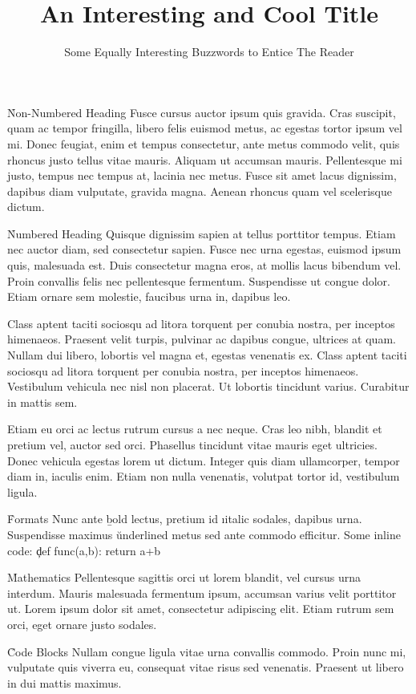 \documentclass{thesis}
\title    {An Interesting and Cool Title}
\subtitle {Some Equally Interesting Buzzwords to Entice The Reader}
\begin{document}

\h*{Non-Numbered Heading}
Fusce cursus auctor ipsum quis gravida. Cras suscipit, quam ac tempor fringilla, libero felis euismod metus, ac egestas tortor ipsum vel mi. Donec feugiat, enim et tempus consectetur, ante metus commodo velit, quis rhoncus justo tellus vitae mauris. Aliquam ut accumsan mauris. Pellentesque mi justo, tempus nec tempus at, lacinia nec metus. Fusce sit amet lacus dignissim, dapibus diam vulputate, gravida magna. Aenean rhoncus quam vel scelerisque dictum.

\h{Numbered Heading}
Quisque dignissim sapien at tellus porttitor tempus. Etiam nec auctor diam, sed consectetur sapien. Fusce nec urna egestas, euismod ipsum quis, malesuada est. Duis consectetur magna eros, at mollis lacus bibendum vel. Proin convallis felis nec pellentesque fermentum. Suspendisse ut congue dolor. Etiam ornare sem molestie, faucibus urna in, dapibus leo.

Class aptent taciti sociosqu ad litora torquent per conubia nostra, per inceptos himenaeos. Praesent velit turpis, pulvinar ac dapibus congue, ultrices at quam. Nullam dui libero, lobortis vel magna et, egestas venenatis ex. Class aptent taciti sociosqu ad litora torquent per conubia nostra, per inceptos himenaeos. Vestibulum vehicula nec nisl non placerat. Ut lobortis tincidunt varius. Curabitur in mattis sem.

Etiam eu orci ac lectus rutrum cursus a nec neque. Cras leo nibh, blandit et pretium vel, auctor sed orci. Phasellus tincidunt vitae mauris eget ultricies. Donec vehicula egestas lorem ut dictum. Integer quis diam ullamcorper, tempor diam in, iaculis enim. Etiam non nulla venenatis, volutpat tortor id, vestibulum ligula.

\h{Formats}
Nunc ante \b{bold} lectus, pretium id \i{italic} sodales, dapibus  urna. Suspendisse maximus \u{underlined} metus sed ante commodo efficitur. Some inline code: \c{def func(a,b): return a+b}

\h{Mathematics}
Pellentesque sagittis orci ut lorem blandit, vel cursus urna interdum. Mauris malesuada fermentum ipsum, accumsan varius velit porttitor ut. Lorem ipsum dolor sit amet, consectetur adipiscing elit. Etiam rutrum sem orci, eget ornare justo sodales.


\h{Code Blocks}
Nullam congue ligula vitae urna convallis commodo. Proin nunc mi, vulputate quis viverra eu, consequat vitae risus sed venenatis. Praesent ut libero in dui mattis maximus.
\end{document}
